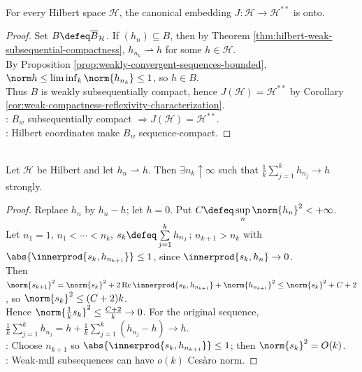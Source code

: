 \begin{theorem} \label{thm:hilbert-spaces-reflexive} \\
For every Hilbert space $\mathcal H$, the canonical embedding $J:\mathcal H\to\mathcal H^{**}$ is onto.
\begin{proof}
Set $B\defeq\overline{B}_{\mathcal H}$. If $(h_n)\subseteq B$, then by Theorem \ref{thm:hilbert-weak-subsequential-compactness}, $h_{n_k}\rightharpoonup h$ for some $h\in\mathcal H$.\\
By Proposition \ref{prop:weakly-convergent-sequences-bounded}, $\norm h\leq\liminf_k\norm{h_{n_k}}\leq1$, so $h\in B$.\\
Thus $B$ is weakly subsequentially compact, hence $J(\mathcal H)=\mathcal H^{**}$ by Corollary \ref{cor:weak-compactness-reflexivity-characterization}.\\
: $B_w$ subsequentially compact $\Longrightarrow J(\mathcal H)=\mathcal H^{**}$.\\
: Hilbert coordinates make $B_w$ sequence-compact.
\end{proof}
\end{theorem}

\begin{theorem} \label{thm:banach-saks-hilbert-space} \\
Let $\mathcal H$ be Hilbert and let $h_n\rightharpoonup h$. Then $\exists n_k\uparrow\infty$ such that $\frac{1}{k}\sum\limits_{j=1}^kh_{n_j}\to h$ strongly.
\begin{proof} Replace $h_n$ by $h_n-h$; let $h=0$. Put $C\defeq\sup\limits_n\norm{h_n}^2<+\infty$.\\
Let $n_1=1$, $n_1<\cdots<n_k$, $s_k\defeq\sum\limits_{j=1}^kh_{n_j}$; $n_{k+1}>n_k$ with $\abs{\innerprod{s_k,h_{n_{k+1}}}}\leq1$, since $\innerprod{s_k,h_n}\to0$.\\
Then $\norm{s_{k+1}}^2=\norm{s_k}^2+2\operatorname{Re}\innerprod{s_k,h_{n_{k+1}}}+\norm{h_{n_{k+1}}}^2\leq\norm{s_k}^2+C+2$, so $\norm{s_k}^2\leq(C+2)k$.\\
Hence $\norm{\frac{1}{k}s_k}^2\leq\frac{C+2}{k}\to0$. For the original sequence, $\frac{1}{k}\sum\limits_{j=1}^kh_{n_j}=h+\frac{1}{k}\sum\limits_{j=1}^k(h_{n_j}-h)\to h$.\\
: Choose $n_{k+1}$ so $\abs{\innerprod{s_k,h_{n_{k+1}}}}\leq1$; then $\norm{s_k}^2=O(k)$.\\
: Weak-null subsequences can have $o(k)$ Ces\`aro norm.
\end{proof}
\end{theorem}

